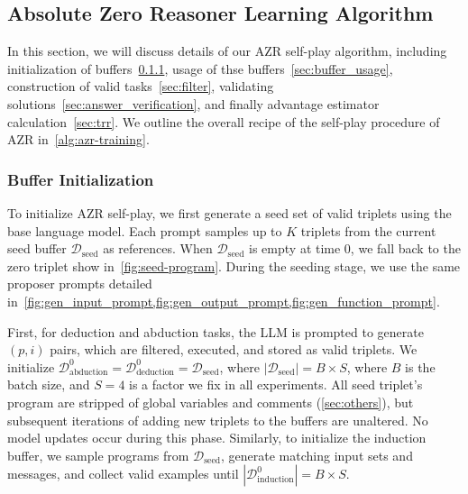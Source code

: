 \documentclass{article}
\begin{document}
\subsection{Absolute Zero Reasoner Learning Algorithm}
\label{sec:algorithm}
In this section, we will discuss details of our AZR self-play algorithm, including initialization of buffers~\ref{sec:seed}, usage of thse buffers~\ref{sec:buffer_usage}, construction of valid tasks~\ref{sec:filter}, validating solutions~\ref{sec:answer_verification}, and finally advantage estimator calculation~\ref{sec:trr}. We outline the overall recipe of the self-play procedure of AZR in~\cref{alg:azr-training}. 

\subsubsection{Buffer Initialization}
\label{sec:seed}

To initialize AZR self-play, we first generate a seed set of valid triplets using the base language model. Each prompt samples up to \(K\) triplets from the current seed buffer \(\mathcal{D}_\text{seed}\) as references. When \(\mathcal{D}_\text{seed}\) is empty at time 0, we fall back to the zero triplet show in~\cref{fig:seed-program}. During the seeding stage, we use the same proposer prompts detailed in~\cref{fig:gen_input_prompt,fig:gen_output_prompt,fig:gen_function_prompt}.

First, for deduction and abduction tasks, the LLM is prompted to generate \((p, i)\) pairs, which are filtered, executed, and stored as valid triplets. We initialize \(\mathcal{D}^0_\text{abduction} = \mathcal{D}^0_\text{deduction} = \mathcal{D}_\text{seed}\), where \(|\mathcal{D}_\text{seed}| = B \times S\), where \(B\) is the batch size, and \(S=4\) is a factor we fix in all experiments. All seed triplet's program are stripped of global variables and comments (\cref{sec:others}), but subsequent iterations of adding new triplets to the buffers are unaltered. No model updates occur during this phase. Similarly, to initialize the induction buffer, we sample programs from \(\mathcal{D}_\text{seed}\), generate matching input sets and messages, and collect valid examples until \(|\mathcal{D}^0_\text{induction}| = B \times S\).
\end{document}

